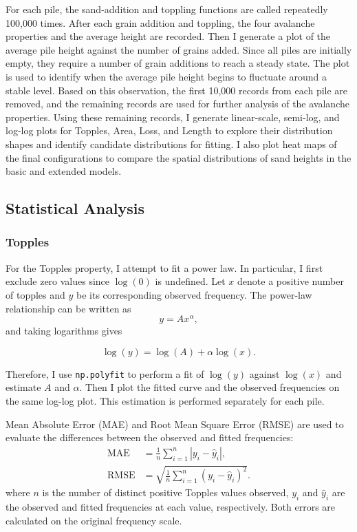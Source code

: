 For each pile, the sand-addition and toppling functions are called repeatedly 100,000 times. After each grain addition and toppling, the four avalanche properties and the average height are recorded. Then I generate a plot of the average pile height against the number of grains added. Since all piles are initially empty, they require a number of grain additions to reach a steady state. The plot is used to identify when the average pile height begins to fluctuate around a stable level. Based on this observation, the first 10,000 records from each pile are removed, and the remaining records are used for further analysis of the avalanche properties. Using these remaining records, I generate linear-scale, semi-log, and log-log plots for Topples, Area, Loss, and Length to explore their distribution shapes and identify candidate distributions for fitting. I also plot heat maps of the final configurations to compare the spatial distributions of sand heights in the basic and extended models.

\subsection{Statistical Analysis}
\subsubsection{Topples}

For the Topples property, I attempt to fit a power law. In particular, I first exclude zero values since $\log(0)$ is undefined. Let $x$ denote a positive number of topples and $y$ be its corresponding observed frequency. The power-law relationship can be written as
$$y = Ax^\alpha,$$
and taking logarithms gives

$$\log(y) = \log(A) + \alpha \log(x).$$

Therefore, I use \texttt{np.polyfit} to perform a fit of $\log(y)$ against $\log(x)$ and estimate $A$ and $\alpha$. Then I plot the fitted curve and the observed frequencies on the same log-log plot. This estimation is performed separately for each pile.

Mean Absolute Error (MAE) and Root Mean Square Error (RMSE) are used to evaluate the differences between the observed and fitted frequencies:
\begin{align*}
	\text{MAE} &= \frac{1}{n}\sum_{i=1}^{n}|y_i-\hat{y}_i|, \\[6pt]
	\text{RMSE} &= \sqrt{\frac{1}{n}\sum_{i=1}^{n}(y_i-\hat{y}_i)^2}.
\end{align*}
where $n$ is the number of distinct positive Topples values observed, $y_i$ and $\hat{y}_i$ are the observed and fitted frequencies at each value, respectively. Both errors are calculated on the original frequency scale.

